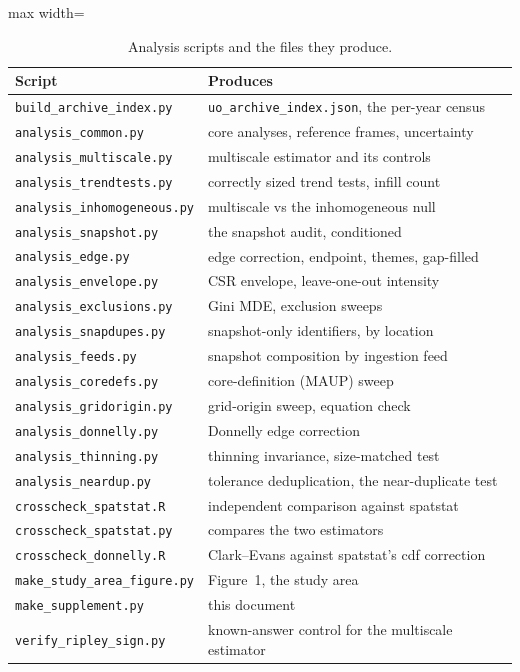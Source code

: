 \documentclass[fleqn,10pt]{wlpeerj}
\begin{document}
\begin{table}[H]
\centering
\caption{Analysis scripts and the files they produce.}
\label{si:scripts}
\small
\begin{adjustbox}{max width=\linewidth}
\begin{tabular}{p{5.2cm}p{7.4cm}}
\toprule
Script & Produces \\
\midrule
\texttt{build\_archive\_index.py} & \texttt{uo\_archive\_index.json}, the per-year census \\
\texttt{analysis\_common.py} & core analyses, reference frames, uncertainty \\
\texttt{analysis\_multiscale.py} & multiscale estimator and its controls \\
\texttt{analysis\_trendtests.py} & correctly sized trend tests, infill count \\
\texttt{analysis\_inhomogeneous.py} & multiscale vs the inhomogeneous null \\
\texttt{analysis\_snapshot.py} & the snapshot audit, conditioned \\
\texttt{analysis\_edge.py} & edge correction, endpoint, themes, gap-filled \\
\texttt{analysis\_envelope.py} & CSR envelope, leave-one-out intensity \\
\texttt{analysis\_exclusions.py} & Gini MDE, exclusion sweeps \\
\texttt{analysis\_snapdupes.py} & snapshot-only identifiers, by location \\
\texttt{analysis\_feeds.py} & snapshot composition by ingestion feed \\
\texttt{analysis\_coredefs.py} & core-definition (MAUP) sweep \\
\texttt{analysis\_gridorigin.py} & grid-origin sweep, equation check \\
\texttt{analysis\_donnelly.py} & Donnelly edge correction \\
\texttt{analysis\_thinning.py} & thinning invariance, size-matched test \\
\texttt{analysis\_neardup.py} & tolerance deduplication, the near-duplicate test \\
\texttt{crosscheck\_spatstat.R} & independent comparison against \textsf{spatstat} \\
\texttt{crosscheck\_spatstat.py} & compares the two estimators \\
\texttt{crosscheck\_donnelly.R} & Clark--Evans against spatstat's cdf correction \\
\texttt{make\_study\_area\_figure.py} & Figure~1, the study area \\
\texttt{make\_supplement.py} & this document \\
\texttt{verify\_ripley\_sign.py} & known-answer control for the multiscale estimator \\
\bottomrule
\end{tabular}
\end{adjustbox}
\end{table}
\end{document}
